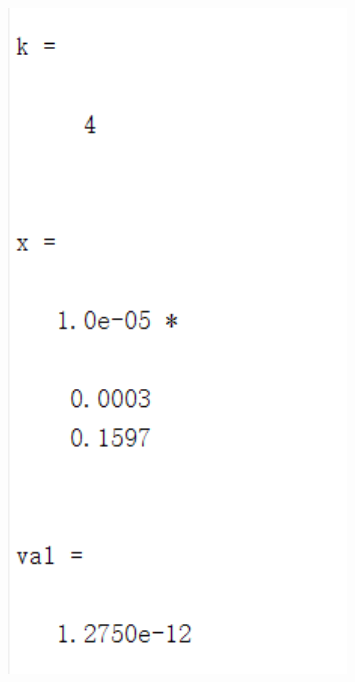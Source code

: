 \documentclass[12pt]{article} %
\begin{document}
\begin{figure}[htbp]
{\begin{minipage}[t]{0.3\linewidth}
		\includegraphics[width=0.8\textwidth]{newton2.png}
	\end{minipage}%
}%


\end{figure}
\end{document}
